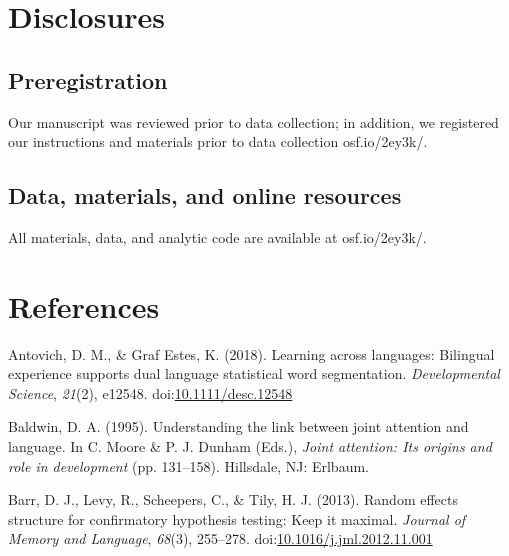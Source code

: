 \documentclass[,man,floatsintext]{apa6}
\begin{document}
\hypertarget{disclosures}{%
\section{Disclosures}\label{disclosures}}

\hypertarget{preregistration}{%
\subsection{Preregistration}\label{preregistration}}

Our manuscript was reviewed prior to data collection; in addition, we registered our instructions and materials prior to data collection osf.io/2ey3k/.

\hypertarget{data-materials-and-online-resources}{%
\subsection{Data, materials, and online resources}\label{data-materials-and-online-resources}}

All materials, data, and analytic code are available at osf.io/2ey3k/.

\newpage

\hypertarget{references}{%
\section{References}\label{references}}

\begingroup
\setlength{\parindent}{-0.5in}
\setlength{\leftskip}{0.5in}

\hypertarget{refs}{}
\leavevmode\hypertarget{ref-Antovich_GrafEstes_2017}{}%
Antovich, D. M., \& Graf Estes, K. (2018). Learning across languages: Bilingual experience supports dual language statistical word segmentation. \emph{Developmental Science}, \emph{21}(2), e12548. doi:\href{https://doi.org/10.1111/desc.12548}{10.1111/desc.12548}

\leavevmode\hypertarget{ref-Baldwin_1995}{}%
Baldwin, D. A. (1995). Understanding the link between joint attention and language. In C. Moore \& P. J. Dunham (Eds.), \emph{Joint attention: Its origins and role in development} (pp. 131--158). Hillsdale, NJ: Erlbaum.

\leavevmode\hypertarget{ref-Barr_etal_2013}{}%
Barr, D. J., Levy, R., Scheepers, C., \& Tily, H. J. (2013). Random effects structure for confirmatory hypothesis testing: Keep it maximal. \emph{Journal of Memory and Language}, \emph{68}(3), 255--278. doi:\href{https://doi.org/10.1016/j.jml.2012.11.001}{10.1016/j.jml.2012.11.001}
\end{document}
